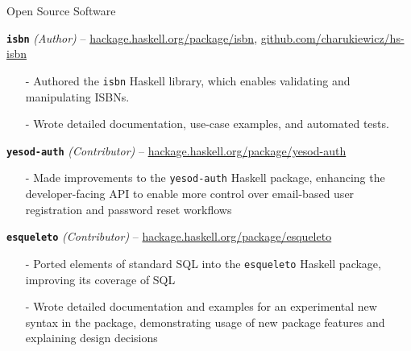 \documentclass{resume} %
\begin{document}
\begin{rSection}{Open Source Software}

\begin{rListSection}
\item \textbf{\texttt{isbn}} {\em (Author)} -- \href{https://hackage.haskell.org/package/isbn}{hackage.haskell.org/package/isbn}, \href{https://github.com/charukiewicz/hs-isbn}{github.com/charukiewicz/hs-isbn}
    \begin{itemize} \itemsep -0.5em \vspace{-0.5em}
    \item[-] Authored the \texttt{isbn} Haskell library, which enables validating and manipulating ISBNs.
    \item[-] Wrote detailed documentation, use-case examples, and automated tests.
    \end{itemize}
\item \textbf{\texttt{yesod-auth}} {\em (Contributor)} -- \href{https://hackage.haskell.org/package/yesod-auth}{hackage.haskell.org/package/yesod-auth}
    \begin{itemize} \itemsep -0.5em \vspace{-0.5em}
    \item[-] Made improvements to the \texttt{yesod-auth} Haskell package, enhancing the developer-facing API to enable more control over email-based user registration and password reset workflows
    \end{itemize}
\item \textbf{\texttt{esqueleto}} {\em (Contributor)} -- \href{https://hackage.haskell.org/package/esqueleto}{hackage.haskell.org/package/esqueleto}
    \begin{itemize} \itemsep -0.5em \vspace{-0.5em}
    \item[-] Ported elements of standard SQL into the \texttt{esqueleto} Haskell package, improving its coverage of SQL
    \item[-] Wrote detailed documentation and examples for an experimental new syntax in the package, demonstrating usage of new package features and explaining design decisions
    \end{itemize}
\end{rListSection}

\end{rSection}

\end{document}
